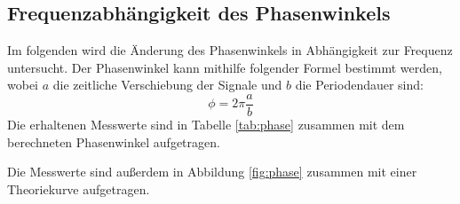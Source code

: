 \subsection{Frequenzabhängigkeit des Phasenwinkels}
Im folgenden wird die Änderung des Phasenwinkels in Abhängigkeit zur Frequenz untersucht.
Der Phasenwinkel kann mithilfe folgender Formel bestimmt werden, wobei $a$ die zeitliche Verschiebung
der Signale und $b$ die Periodendauer sind:
\begin{equation}
    \phi = 2\pi \frac{a}{b}
\end{equation}
Die erhaltenen Messwerte sind in Tabelle \ref{tab:phase} zusammen mit dem berechneten Phasenwinkel
aufgetragen.
\begin{table}[H]
        \caption{Messdaten des Phasenwinkels.}
        \label{tab:phase}
        \centering
\end{table}
\noindent
Die Messwerte sind außerdem in Abbildung \ref{fig:phase} zusammen mit einer Theoriekurve aufgetragen.
